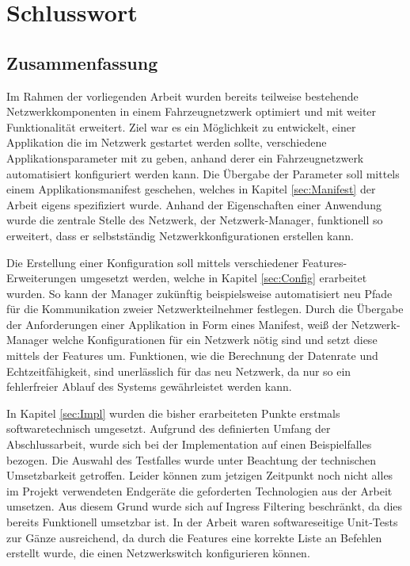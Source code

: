 \chapter{Schlusswort}
\section{Zusammenfassung}
Im Rahmen der vorliegenden Arbeit wurden bereits teilweise bestehende Netzwerkkomponenten in einem Fahrzeugnetzwerk optimiert und mit weiter Funktionalität erweitert. Ziel war es ein Möglichkeit zu entwickelt, einer Applikation die im Netzwerk gestartet werden sollte, verschiedene Applikationsparameter mit zu geben, anhand derer ein Fahrzeugnetzwerk automatisiert konfiguriert werden kann. Die Übergabe der Parameter soll mittels einem Applikationsmanifest geschehen, welches in Kapitel \ref{sec:Manifest} der Arbeit eigens spezifiziert wurde. Anhand der Eigenschaften einer Anwendung wurde die zentrale Stelle des Netzwerk, der Netzwerk-Manager, funktionell so erweitert, dass er selbstständig Netzwerkkonfigurationen erstellen kann. 

Die Erstellung einer Konfiguration soll mittels verschiedener Features-Erweiterungen umgesetzt werden, welche in Kapitel \ref{sec:Config} erarbeitet wurden. So kann der Manager zukünftig beispielsweise automatisiert neu Pfade für die Kommunikation zweier Netzwerkteilnehmer festlegen. Durch die Übergabe der Anforderungen einer Applikation in Form eines	 Manifest, weiß der Netzwerk-Manager welche Konfigurationen für ein Netzwerk nötig sind und setzt diese mittels der Features um. Funktionen, wie die Berechnung der Datenrate und Echtzeitfähigkeit, sind unerlässlich für das neu Netzwerk, da nur so ein fehlerfreier Ablauf des Systems gewährleistet werden kann.

\newpage

In Kapitel \ref{sec:Impl} wurden die bisher erarbeiteten Punkte erstmals softwaretechnisch umgesetzt. Aufgrund des definierten Umfang der Abschlussarbeit, wurde sich bei der Implementation auf einen Beispielfalles bezogen. Die Auswahl des Testfalles wurde unter Beachtung der technischen Umsetzbarkeit getroffen. Leider können zum jetzigen Zeitpunkt noch nicht alles im Projekt verwendeten Endgeräte die geforderten Technologien aus der Arbeit umsetzen. Aus diesem Grund wurde sich auf Ingress Filtering beschränkt, da dies bereits Funktionell umsetzbar ist. In der Arbeit waren softwareseitige Unit-Tests zur Gänze ausreichend, da durch die Features eine korrekte Liste an Befehlen erstellt wurde, die einen Netzwerkswitch konfigurieren können. 

